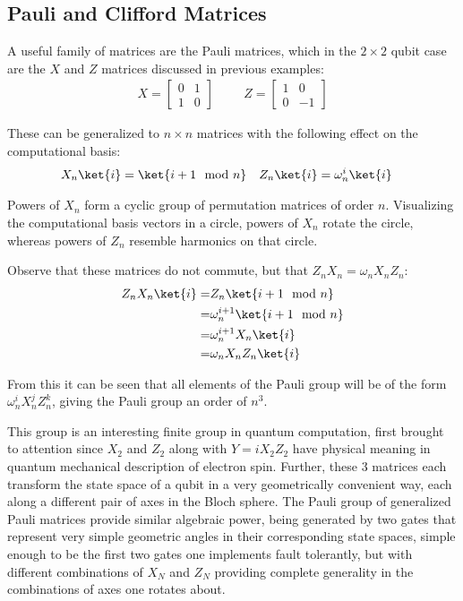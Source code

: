 \subsection{Pauli and Clifford Matrices}\label{pauli}
A useful family of matrices are the Pauli matrices, which in the $2\times2$ qubit case are the $X$ and $Z$ matrices discussed in previous examples:
\begin{align*}
X = \left[\begin{matrix}
0&1\\
1&0
\end{matrix}\right]
&&&
Z = \left[\begin{matrix}
1&0\\
0&-1
\end{matrix}\right]
\end{align*}

These can be generalized to $n\times n$ matrices with the following effect on the computational basis:
\begin{align*}
X_n\ket{i} = \ket{i+1\mod n}
&&&
Z_n\ket{i} = \omega_n^i\ket{i}
\end{align*}

Powers of $X_n$ form a cyclic group of permutation matrices of order $n$. Visualizing the computational basis vectors in a circle, powers of $X_n$ rotate the circle, whereas powers of $Z_n$ resemble harmonics on that circle.

Observe that these matrices do not commute, but that $Z_nX_n = \omega_nX_nZ_n$:
\begin{align*}
	Z_nX_n\ket{i}
	=& Z_n\ket{i+1\mod n}
	\\=& \omega_n^{i+1}\ket{i+1\mod n}
	\\=& \omega_n^{i+1}X_n\ket{i}
	\\=& \omega_nX_nZ_n\ket{i}
\end{align*}

From this it can be seen that all elements of the Pauli group will be of the form $\omega_n^iX_n^jZ_n^k$, giving the Pauli group an order of $n^3$.

This group is an interesting finite group in quantum computation, first brought to attention since $X_2$ and $Z_2$ along with $Y  = iX_2Z_2$ have physical meaning in quantum mechanical description of electron spin. Further, these 3 matrices each transform the state space of a qubit in a very geometrically convenient way, each along a different pair of axes in the Bloch sphere. The Pauli group of generalized Pauli matrices provide similar algebraic power, being generated by two gates that represent very simple geometric angles in their corresponding state spaces, simple enough to be the first two gates one implements fault tolerantly, but with different combinations of $X_N$ and $Z_N$ providing complete generality in the combinations of axes one rotates about.

